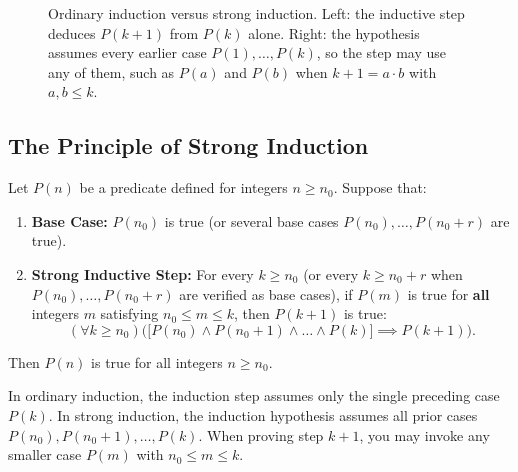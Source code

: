 \begin{figure}[htbp]
\caption{Ordinary induction versus strong induction. Left: the inductive step deduces $P(k+1)$ from $P(k)$ alone. Right: the hypothesis assumes every earlier case $P(1), \dots, P(k)$, so the step may use any of them, such as $P(a)$ and $P(b)$ when $k+1 = a \cdot b$ with $a, b \le k$.}
\label{18:fig-induction-comparison}
\end{figure}

\subsection{The Principle of Strong Induction}

\begin{theorem}
\label{18:thm-strong-induction}
Let $P(n)$ be a predicate defined for integers $n \ge n_0$. Suppose that:
\begin{enumerate}[label=(\roman*)]
\item \textbf{Base Case:} $P(n_0)$ is true (or several base cases $P(n_0), \dots, P(n_0 + r)$ are true).
\item \textbf{Strong Inductive Step:} For every $k \ge n_0$ (or every $k \ge n_0 + r$ when $P(n_0), \dots, P(n_0 + r)$ are verified as base cases), if $P(m)$ is true for \textbf{all} integers $m$ satisfying $n_0 \le m \le k$, then $P(k+1)$ is true:
\[
(\forall k \ge n_0)\Big(\big[P(n_0) \land P(n_0 + 1) \land \dots \land P(k)\big] \implies P(k+1)\Big).
\]
\end{enumerate}
Then $P(n)$ is true for all integers $n \ge n_0$.
\end{theorem}

\begin{intuitionbox}
In ordinary induction, the induction step assumes only the single preceding case $P(k)$. In strong induction, the induction hypothesis assumes all prior cases $P(n_0), P(n_0 + 1), \dots, P(k)$. When proving step $k+1$, you may invoke any smaller case $P(m)$ with $n_0 \le m \le k$.
\end{intuitionbox}

